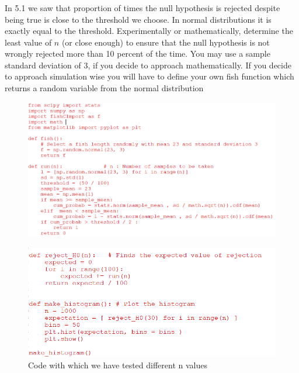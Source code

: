 \documentclass[answers]{exam}
\begin{document}
\subsubsection{} In 5.1 we saw that proportion of times the null hypothesis is rejected despite being true is close to
the threshold we choose. In normal distributions it is exactly equal to the threshold. Experimentally or mathematically, determine the least value of $n$ (or close enough) to ensure that the null hypothesis is not wrongly rejected more than 10 percent of the time. You may use a sample standard deviation
of 3, if you decide to approach mathematically. If you decide to approach simulation wise you will have to define your own fish function which returns a random variable from the normal distribution
\begin{framed}

\begin{figure}[H] %
    \centering
    \includegraphics[width= 1 \textwidth]{Q5.2.3_code1.PNG}
\end{figure}

\begin{figure}[H] %
    \centering
    \includegraphics[width= 1 \textwidth]{Q5.2.3_code2.PNG}
    \caption{Code with which we have tested different n values }
\end{figure}



\end{framed}
\end{document}

